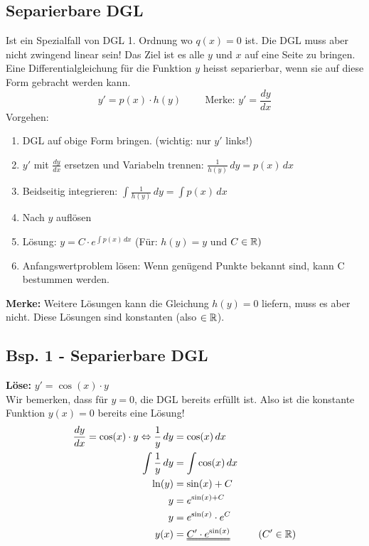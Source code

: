 \subsection{Separierbare DGL}
Ist ein Spezialfall von DGL 1. Ordnung wo $q(x) = 0$ ist. Die DGL muss aber nicht zwingend linear sein! Das Ziel ist es alle $y$ und $x$ auf eine Seite zu bringen.
Eine Differentialgleichung für die Funktion $y$ heisst separierbar, wenn sie auf diese Form gebracht werden kann.
\[
	y' = p(x) \cdot h(y) \hspace{1cm} \text{Merke: $y' = \frac{dy}{dx}$}
\]
Vorgehen:
\begin{enumerate}
	\item DGL auf obige Form bringen. (wichtig: nur $y'$ links!)

	\item $y'$ mit $\frac{dy}{dx}$ ersetzen und Variabeln trennen: $\frac{1}{h(y)} \, dy = p(x) \, dx$

	\item Beidseitig integrieren: $\int \frac{1}{h(y)} \, dy = \int p(x) \, dx$

	\item Nach $y$ auflösen

	\item Lösung: $y = C \cdot e^{\int p(x) \, dx}$ \hspace{0.5cm} (Für: $h(y) = y$ und $C \in \mathbb{R})$

	\item Anfangswertproblem lösen: Wenn genügend Punkte bekannt sind, kann C bestummen werden.
\end{enumerate}
\textbf{Merke:} Weitere Lösungen kann die Gleichung $h(y) = 0$ liefern, muss es aber nicht. Diese Lösungen sind konstanten (also $\in \mathbb{R}$).

\subsection{Bsp. 1 - Separierbare DGL}
\textbf{Löse:} $y' = \cos(x) \cdot y$ \\
{\small Wir bemerken, dass für $y = 0$, die DGL bereits erfüllt ist. Also ist die konstante Funktion $y(x) = 0$ bereits eine Lösung!}
\begin{align*}
	\frac{dy}{dx} = \cos(x) \cdot y \Leftrightarrow \frac{1}{y} \, dy &= \cos(x) \, dx\\
	\int \frac{1}{y} \, dy &= \int \cos(x) \, dx \\
	\ln(y) &= \sin(x) + C\\
	y &= e^{\sin(x) + C} \\
	y &= e^{\sin(x)} \cdot e^C \\
	y(x) &= \uuline{C' \cdot e^{\sin(x)}}	\hspace{1cm} (C' \in \R)
\end{align*}

